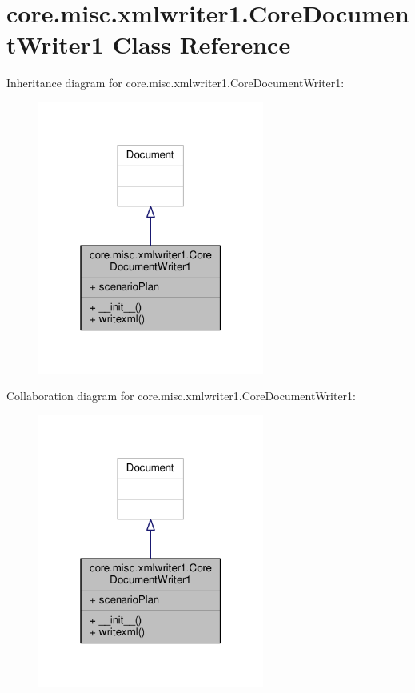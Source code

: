 \hypertarget{classcore_1_1misc_1_1xmlwriter1_1_1_core_document_writer1}{\section{core.\+misc.\+xmlwriter1.\+Core\+Document\+Writer1 Class Reference}
\label{classcore_1_1misc_1_1xmlwriter1_1_1_core_document_writer1}
}


Inheritance diagram for core.\+misc.\+xmlwriter1.\+Core\+Document\+Writer1\+:
\nopagebreak
\begin{figure}[H]
\begin{center}
\leavevmode
\includegraphics[width=211pt]{classcore_1_1misc_1_1xmlwriter1_1_1_core_document_writer1__inherit__graph}
\end{center}
\end{figure}


Collaboration diagram for core.\+misc.\+xmlwriter1.\+Core\+Document\+Writer1\+:
\nopagebreak
\begin{figure}[H]
\begin{center}
\leavevmode
\includegraphics[width=211pt]{classcore_1_1misc_1_1xmlwriter1_1_1_core_document_writer1__coll__graph}
\end{center}
\end{figure}
